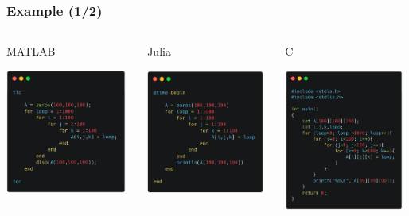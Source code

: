 \documentclass[]{beamer}
\begin{document}
\begin{frame}
  \frametitle{Example (1/2)}
\vspace{3mm}
   
          \begin{columns}
      \begin{column}{0.33\textwidth}

\centerline{MATLAB}
\medskip
{\includegraphics[angle=0,origin=t,width=39.6mm]{exempleMatLab.png}} 
\vspace{1.5mm}

      \end{column}
      
      \begin{column}{0.32\textwidth}

\centerline{Julia} 
\medskip
{\includegraphics[angle=0,origin=t,width=38.5mm]{exempleJL.png}}
\vspace{1.5mm}       
 
      \end{column}  


      \begin{column}{0.32\textwidth}

\centerline{C} 
\vspace{1.7mm}
\includegraphics[angle=0,origin=t,width=38.99mm]{exempleC.png}

      \end{column}          
      \end{columns}

\end{frame}
\end{document}
